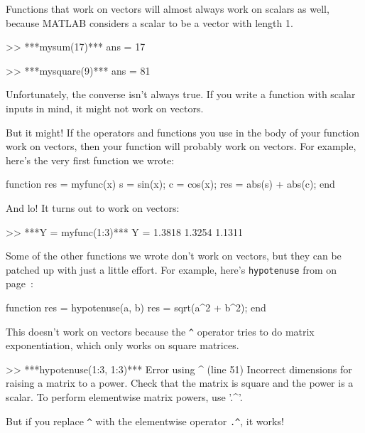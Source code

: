 Functions that work on vectors will almost always work on scalars
as well, because MATLAB considers a scalar to be a vector with
length 1.


\begin{code}
>> ***mysum(17)***
ans = 17

>> ***mysquare(9)***
ans = 81
\end{code}

Unfortunately, the converse isn't always true.  If you write
a function with scalar inputs in mind, it might not work on vectors.

But it might!  If the operators and functions
you use in the body of your function work on vectors, then your
function will probably work on vectors.
For example, here's the very first function we wrote:

\begin{code}
function res = myfunc(x)
    s = sin(x);
    c = cos(x);
    res = abs(s) + abs(c);
end
\end{code}

And lo!  It turns out to work on vectors:

\begin{code}
>> ***Y = myfunc(1:3)***
Y = 1.3818    1.3254    1.1311
\end{code}

Some of the other functions we wrote don't work on vectors,
but they can be patched up with just a little effort.  For example,
here's \lstinline{hypotenuse} from  on page~\pageref{hypotenuse_exercise}:

\begin{code}
function res = hypotenuse(a, b)
    res = sqrt(a^2 + b^2);
end
\end{code}

This doesn't work on vectors because the \lstinline{^} operator
tries to do matrix exponentiation, which only works on
square matrices.


\begin{code}
>> ***hypotenuse(1:3, 1:3)***
Error using  ^  (line 51)
Incorrect dimensions for raising a matrix to a power. 
Check that the matrix is square and the power is a scalar. 
To perform elementwise matrix powers, use '.^'.
\end{code}

But if you replace \lstinline{^} with the elementwise operator
\lstinline{.^}, it works!

